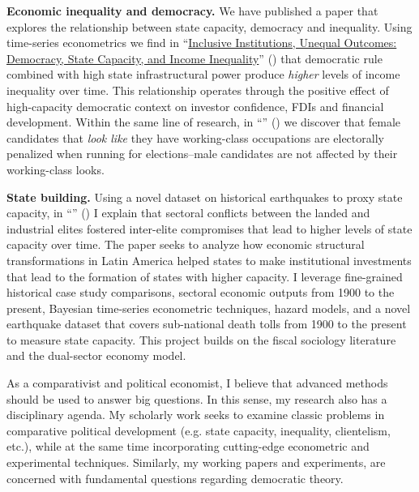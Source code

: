 {\bf Economic inequality and democracy.} We have published a paper that explores the relationship between state capacity, democracy and inequality. Using time-series econometrics we find in ``\href{https://doi.org/10.1016/j.ejpoleco.2021.102048}{Inclusive Institutions, Unequal Outcomes: Democracy, State Capacity, and Income Inequality}'' ({\unskip}) that democratic rule combined with high state infrastructural power produce \emph{higher} levels of income inequality over time. This relationship operates through the positive effect of high-capacity democratic context on investor confidence, FDIs and financial development. Within the same line of research, in ``\href{https://github.com/hbahamonde/Physical/raw/main/Bahamonde_Sarpila.pdf}{{\unskip}}'' ({\unskip}) we discover that female candidates that \emph{look like} they have working-class occupations are electorally penalized when running for elections--male candidates are not affected by their working-class looks.

{\bf State building.} Using a novel dataset on historical earthquakes to proxy state capacity, in ``\href{https://github.com/hbahamonde/Earthquake_Paper/raw/master/Bahamonde_Earthquake_Paper.pdf}{{\unskip}}'' ({\unskip}) I explain that sectoral conflicts between the landed and industrial elites fostered inter-elite compromises that lead to higher levels of state capacity over time. The paper seeks to analyze how economic structural transformations in Latin America helped states to make institutional investments that lead to the formation of states with higher capacity. I leverage fine-grained historical case study comparisons, sectoral economic outputs from 1900 to the present, Bayesian time-series econometric techniques, hazard models, and a novel earthquake dataset that covers sub-national death tolls from 1900 to the present to measure state capacity. This project builds on the fiscal sociology literature and the dual-sector economy model. 


As a comparativist and political economist, I believe that advanced methods should be used to answer big questions. In this sense, my research also has a disciplinary agenda. My scholarly work seeks to examine classic problems in comparative political development (e.g. state capacity, inequality, clientelism, etc.), while at the same time incorporating cutting-edge econometric and experimental techniques. Similarly, my working papers and experiments, are concerned with fundamental questions regarding democratic theory.

